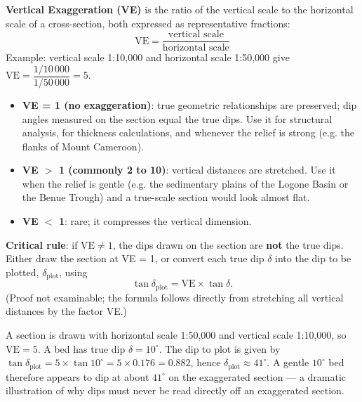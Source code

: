 \documentclass[11pt]{article}
\newcommand{\cle}[1]{{\popxbold\color{popdark}#1}}
\newcounter{popsec}
\newcounter{popsub}
\newcommand{\courssub}[1]{%
  \stepcounter{popsub}%
  \par\vspace{9pt}\noindent{\popxbold\fontsize{11.5}{13}\selectfont\color{popink}{\color{poporange}\thepopsec.\thepopsub}\hspace{6pt}#1}\par\nopagebreak\vspace{4pt}
}
\begin{document}
\courssub{Vertical Exaggeration (VE)}

\begin{definition}
\textbf{Vertical Exaggeration (VE)} is the ratio of the vertical scale to the horizontal scale of a cross-section, both expressed as representative fractions:
\[
\boxed{\mathrm{VE} = \frac{\text{vertical scale}}{\text{horizontal scale}}}
\]
Example: vertical scale 1:10,000 and horizontal scale 1:50,000 give $\mathrm{VE} = \dfrac{1/10\,000}{1/50\,000} = 5$.
\end{definition}

\begin{propriete}
\begin{itemize}
  \item \textbf{VE = 1 (no exaggeration)}: true geometric relationships are preserved; dip angles measured on the section equal the true dips. Use it for structural analysis, for thickness calculations, and whenever the relief is strong (e.g. the flanks of Mount Cameroon).
  \item \textbf{VE $>$ 1 (commonly 2 to 10)}: vertical distances are stretched. Use it when the relief is gentle (e.g. the sedimentary plains of the \cle{Logone Basin} or the \cle{Benue Trough}) and a true-scale section would look almost flat.
  \item \textbf{VE $<$ 1}: rare; it compresses the vertical dimension.
\end{itemize}
\textbf{Critical rule}: if $\mathrm{VE} \neq 1$, the dips drawn on the section are \textbf{not} the true dips. Either draw the section at VE = 1, or convert each true dip $\delta$ into the dip to be plotted, $\delta_{\text{plot}}$, using
\[
\tan\delta_{\text{plot}} = \mathrm{VE} \times \tan\delta .
\]
(Proof not examinable; the formula follows directly from stretching all vertical distances by the factor VE.)
\end{propriete}

\begin{exemplebox}
A section is drawn with horizontal scale 1:50,000 and vertical scale 1:10,000, so $\mathrm{VE} = 5$. A bed has true dip $\delta = 10^{\circ}$. The dip to plot is given by $\tan\delta_{\text{plot}} = 5 \times \tan 10^{\circ} = 5 \times 0.176 = 0.882$, hence $\delta_{\text{plot}} \approx 41^{\circ}$. A gentle $10^{\circ}$ bed therefore appears to dip at about $41^{\circ}$ on the exaggerated section — a dramatic illustration of why dips must never be read directly off an exaggerated section.
\end{exemplebox}
\end{document}
